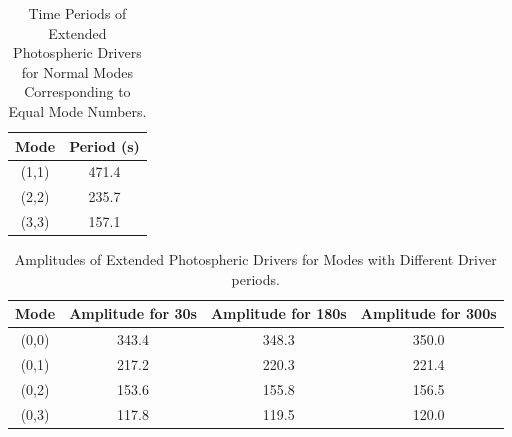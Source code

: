 \documentclass{aa}
\begin{document}
\begin{table}\label{simcperiods}
\centering
\begin{tabular}{c c }
\hline
Mode   &  Period (s) \\
\hline
(1,1) & 471.4  \\
\hline
(2,2) & 235.7   \\
\hline
(3,3) & 157.1   \\
\hline

\end{tabular} 
\caption{Time Periods of Extended Photospheric Drivers for Normal Modes Corresponding to Equal Mode Numbers.}
\end{table}









\begin{table}\label{simamps}
\centering
\begin{tabular}{c c c c }
\hline
Mode   &  Amplitude for 30s &  Amplitude for 180s &  Amplitude for 300s\\
\hline
(0,0) & 343.4 & 348.3 & 350.0 \\
\hline
(0,1) & 217.2 & 220.3 & 221.4 \\
\hline
(0,2) & 153.6 & 155.8 & 156.5 \\
\hline
(0,3) & 117.8 & 119.5 & 120.0 \\
\hline
\end{tabular} 
\caption{Amplitudes of Extended Photospheric Drivers for Modes with Different Driver periods.}
\end{table}
















 



\end{document}
